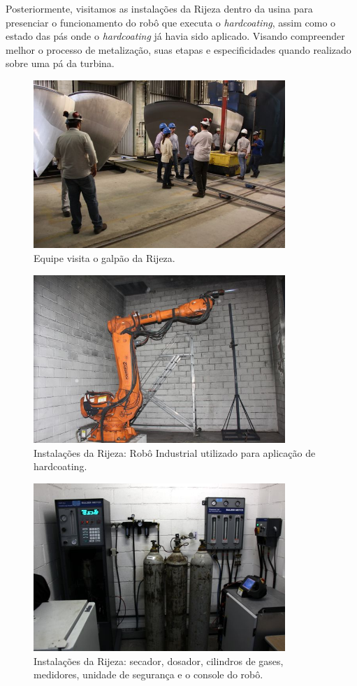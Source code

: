 \documentclass{article}
\begin{document}
Posteriormente, visitamos as instalações da Rijeza dentro da usina para
presenciar o funcionamento do robô que executa o \textit{hardcoating}, assim como o
estado das pás onde o \textit{hardcoating} já havia sido aplicado. Visando compreender
melhor o processo de metalização, suas etapas e especificidades quando realizado
sobre uma pá da turbina.

\begin{figure}[H]
\centering
\includegraphics[width=0.85\textwidth]{Fotos/img_4881.jpg}
\caption{Equipe visita o galpão da Rijeza.}
\end{figure}
\begin{figure}[H]
\centering
\includegraphics[width=0.85\textwidth]{Fotos/img_4858.jpg}
\caption{Instalações da Rijeza: Robô Industrial utilizado para
aplicação de hardcoating.}
\end{figure}
\begin{figure}[H]
\centering
\includegraphics[width=0.85\textwidth]{Fotos/img_4850.jpg}
\caption{Instalações da Rijeza: secador, dosador, cilindros de gases, medidores,
unidade de segurança e o console do robô.}
\end{figure}
\end{document}
